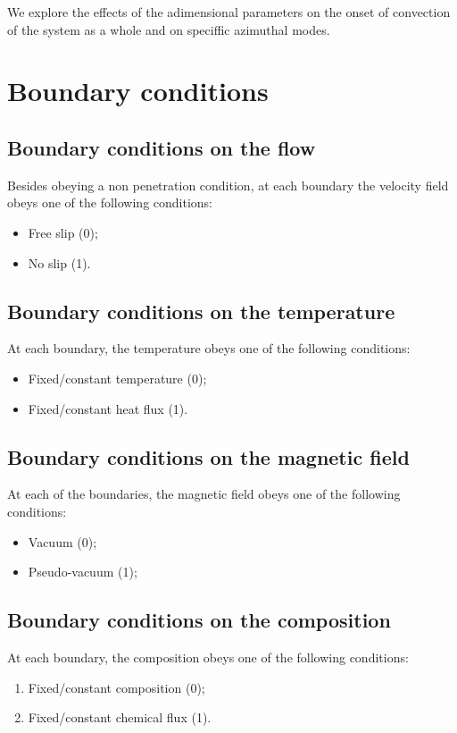\documentclass[a4paper,10pt]{book}
\begin{document}
We explore the effects of the adimensional parameters on the onset of convection
of the system as a whole and on speciffic azimuthal modes.

\section{Boundary conditions}
\label{s:boundaryConditions}

\subsection{Boundary conditions on the flow}
Besides obeying a non penetration condition, at each boundary the velocity
field obeys one of the following conditions:
\begin{itemize}
\item Free slip (0);
\item No slip (1).
\end{itemize}

\subsection{Boundary conditions on the temperature}
At each boundary, the temperature obeys one of the following conditions:
\begin{itemize}
 \item Fixed/constant temperature (0);
 \item Fixed/constant heat flux (1).
\end{itemize}

\subsection{Boundary conditions on the magnetic field}
At each of the boundaries, the magnetic field obeys one of the following
conditions:
\begin{itemize}
 \item Vacuum (0);
 \item Pseudo-vacuum (1);
\end{itemize}

\subsection{Boundary conditions on the composition}
At each boundary, the composition obeys one of the following conditions:
\begin{enumerate}
 \item Fixed/constant composition (0);
 \item Fixed/constant chemical flux (1).
\end{enumerate}
\end{document}
